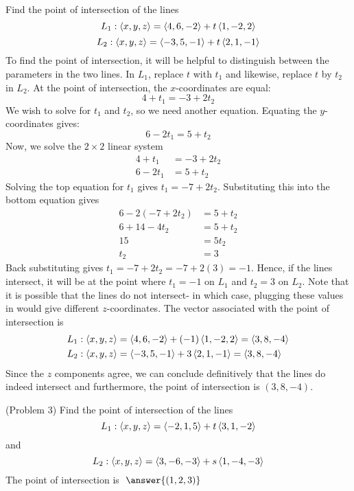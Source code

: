 \documentclass[handout]{ximera}
\begin{document}
\begin{example}[Example 3]
Find the point of intersection of the lines
\[
L_1: \left\langle x, y, z\right\rangle = \left\langle 4, 6, -2\right\rangle + t\left\langle 1, -2, 2\right\rangle
\]
\[
L_2: \left\langle x, y, z\right\rangle = \left\langle -3, 5, -1\right\rangle + t\left\langle 2, 1, -1\right\rangle
\]
To find the point of intersection, it will be helpful to distinguish between the parameters in the two lines.
In $L_1$, replace $t$ with $t_1$ and likewise, replace $t$ by $t_2$ in $L_2$. 
At the point of intersection, the $x$-coordinates are equal:
\[
4+t_1 = -3 + 2t_2
\]
We wish to solve for $t_1$ and $t_2$, so we need another equation. Equating the $y$-coordinates gives:
\[
6 -2t_1 = 5 + t_2
\]
Now, we solve the $2 \times 2$ linear system
\begin{align*}
4+t_1 &= -3 + 2t_2\\
6 -2t_1 &= 5 + t_2
\end{align*}
Solving the top equation for $t_1$ gives $t_1 = -7 + 2t_2$.  Substituting this into the bottom equation gives
\begin{align*}
6 - 2(-7+2t_2) &= 5 + t_2\\
6 + 14 - 4t_2 & = 5 + t_2\\
15 &= 5t_2\\
t_2 &=3
\end{align*}
Back substituting gives $t_1 = -7 + 2t_2 = -7 + 2(3) = -1$.
Hence, if the lines intersect, it will be at the point where $t_1 = -1$ on $L_1$ and $t_2 = 3$ on $L_2$.
Note that it is possible that the lines do not intersect- in which case, plugging these values in would 
give different $z$-coordinates.
The vector associated with the point of intersection is
\begin{align*}
L_1: \left\langle x, y, z\right\rangle &= \left\langle 4, 6, -2\right\rangle + (-1)\left\langle 1, -2, 2\right\rangle = \left\langle 3, 8, -4\right\rangle\\
L_2: \left\langle x, y, z\right\rangle &= \left\langle -3, 5, -1\right\rangle + 3\left\langle 2, 1, -1\right\rangle = \left\langle 3, 8, -4\right\rangle
\end{align*}
Since the $z$ components agree, we can conclude definitively that the lines do indeed intersect and furthermore, 
the point of intersection is $(3, 8, -4)$.
\end{example}

\begin{problem}(Problem 3)
Find the point of intersection of the lines
\[
L_1: \left\langle x, y, z\right\rangle = \left\langle -2, 1, 5\right\rangle + t\left\langle 3, 1, -2\right\rangle
\]
and 
\[
L_2: \left\langle x, y, z\right\rangle = \left\langle 3, -6, -3\right\rangle + s\left\langle 1, -4, -3\right\rangle
\]
The point of intersection is $\;\answer{(1, 2, 3)}$
\end{problem}
\end{document}
